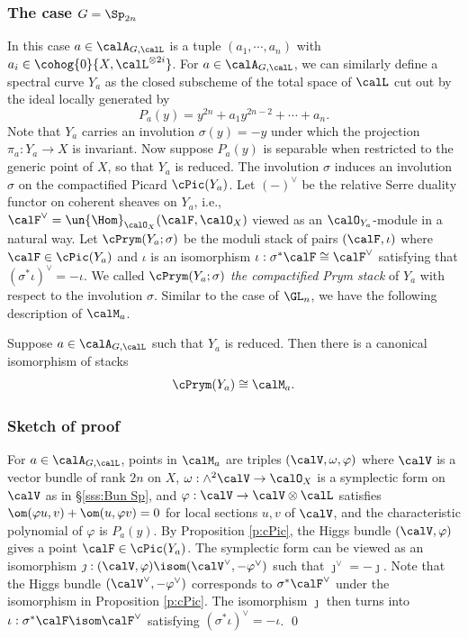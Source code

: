 \subsubsection{The case $G=\Sp_{2n}$} In this case $a\in\calA_{G,\calL}$ is a tuple $(a_{1},\cdots, a_{n})$ with $a_{i}\in\cohog{0}{X,\calL^{\otimes2i}}$. For $a\in\calA_{G,\calL}$, we can similarly define a spectral curve $Y_{a}$ as the closed subscheme of the total space of $\calL$ cut out by the ideal locally generated by
\begin{equation*}
P_{a}(y)=y^{2n}+a_{1}y^{2n-2}+\cdots+a_{n}.
\end{equation*}
Note that $Y_{a}$ carries an involution  $\sigma(y)=-y$ under which the projection $\pi_{a}: Y_{a}\to X$ is invariant. Now suppose $P_{a}(y)$ is separable when restricted to the generic point of $X$, so that $Y_{a}$ is reduced. The involution $\sigma$ induces an involution $\sigma$ on the compactified Picard $\cPic(Y_{a})$. Let $(-)^{\vee}$ be the relative Serre duality functor on coherent sheaves on $Y_{a}$, i.e., $\calF^{\vee}=\un{\Hom}_{\calO_{X}}(\calF,\calO_{X})$ viewed as an $\calO_{Y_{a}}$-module in a natural way. Let $\cPrym(Y_{a};\sigma)$ be the moduli stack of pairs $(\calF,\iota)$ where $\calF\in\cPic(Y_{a})$ and $\iota$ is an isomorphism $\iota: \sigma^{*}\calF\cong\calF^{\vee}$ satisfying that $(\sigma^{*}\iota)^{\vee}=-\iota$. We called $\cPrym(Y_{a};\sigma)$ {\em the compactified Prym stack} of $Y_{a}$ with respect to the involution $\sigma$. Similar to the case of $\GL_{n}$, we have the following description of $\calM_{a}$.

\begin{prop} Suppose $a\in\calA_{G,\calL}$ such that $Y_{a}$ is reduced. Then there is a canonical isomorphism of stacks
\begin{equation*}
\cPrym(Y_{a})\cong\calM_{a}.
\end{equation*}
\end{prop}

\subsubsection{Sketch of proof}
For $a\in\calA_{G,\calL}$, points in $\calM_{a}$ are triples $(\calV,\omega, \varphi)$ where $\calV$ is a vector bundle of rank $2n$ on $X$, $\omega: \wedge^{2}\calV\to\calO_{X}$ is a symplectic form on $\calV$ as in \S\ref{sss:Bun Sp}, and $\varphi:\calV\to\calV\otimes\calL$ satisfies $\om(\varphi u, v)+\om(u, \varphi v)=0$ for local sections $u,v$ of $\calV$, and the characteristic polynomial of $\varphi$ is $P_{a}(y)$. By Proposition \ref{p:cPic}, the Higgs bundle $(\calV,\varphi)$ gives a point $\calF\in\cPic(Y_{a})$. The symplectic form can be viewed as an isomorphism $\jmath: (\calV,\varphi)\isom (\calV^{\vee}, -\varphi^{\vee})$ such that $\jmath^{\vee}=-\jmath$. Note that the Higgs bundle $(\calV^{\vee}, -\varphi^{\vee})$ corresponds to $\sigma^{*}\calF^{\vee}$ under the isomorphism in Proposition \ref{p:cPic}. The isomorphism $\jmath$ then turns into $\iota:  \sigma^{*}\calF\isom\calF^{\vee}$ satisfying $(\sigma^{*}\iota)^{\vee}=-\iota$.  \qed







